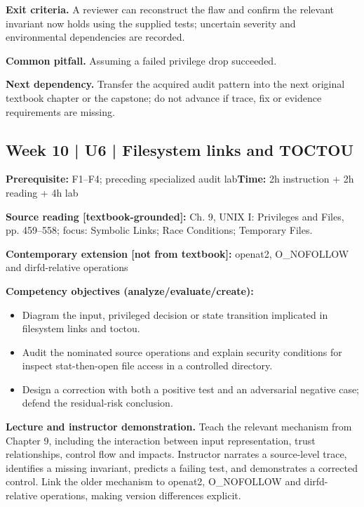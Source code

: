 \documentclass[10pt,letterpaper]{article}
\begin{document}
\textbf{Exit criteria.} A reviewer can reconstruct the flaw and confirm the relevant invariant now holds using the supplied tests; uncertain severity and environmental dependencies are recorded.

\textbf{Common pitfall.} Assuming a failed privilege drop succeeded.

\textbf{Next dependency.} Transfer the acquired audit pattern into the next original textbook chapter or the capstone; do not advance if trace, fix or evidence requirements are missing.

\subsection{Week 10 | U6 | Filesystem links and TOCTOU}
\textbf{Prerequisite:} F1--F4; preceding specialized audit lab\hfill\textbf{Time:} 2h instruction + 2h reading + 4h lab

\textbf{Source reading [textbook-grounded]:} Ch. 9, UNIX I: Privileges and Files, pp. 459--558; focus: Symbolic Links; Race Conditions; Temporary Files.

\textbf{Contemporary extension [not from textbook]:} openat2, O\_NOFOLLOW and dirfd-relative operations

\textbf{Competency objectives (analyze/evaluate/create):}
\begin{itemize}[leftmargin=*,itemsep=2pt]
\item Diagram the input, privileged decision or state transition implicated in filesystem links and toctou.
\item Audit the nominated source operations and explain security conditions for inspect stat-then-open file access in a controlled directory.
\item Design a correction with both a positive test and an adversarial negative case; defend the residual-risk conclusion.
\end{itemize}
\textbf{Lecture and instructor demonstration.} Teach the relevant mechanism from Chapter 9, including the interaction between input representation, trust relationships, control flow and impacts. Instructor narrates a source-level trace, identifies a missing invariant, predicts a failing test, and demonstrates a corrected control. Link the older mechanism to openat2, O\_NOFOLLOW and dirfd-relative operations, making version differences explicit.
\end{document}
